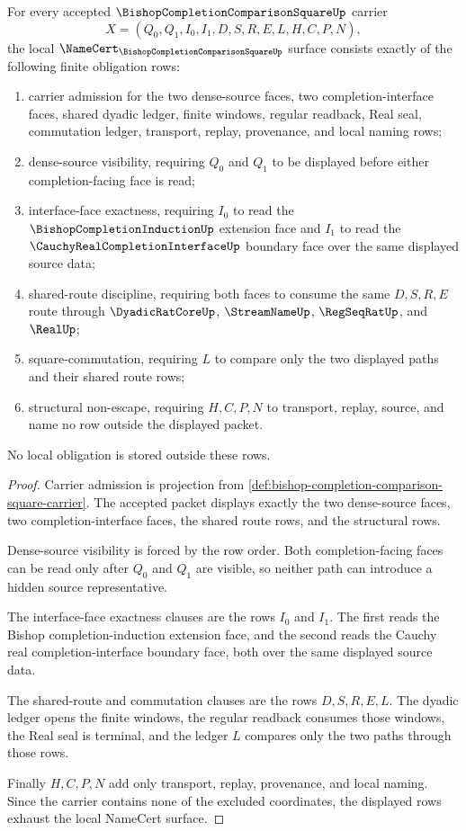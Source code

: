\begin{theorem}
\label{thm:bishop-completion-comparison-square-namecert-obligations}
For every accepted $\BishopCompletionComparisonSquareUp$ carrier
$$
X=(Q_0,Q_1,I_0,I_1,D,S,R,E,L,H,C,P,N),
$$
the local $\NameCert_{\BishopCompletionComparisonSquareUp}$ surface consists exactly of the following finite obligation rows:
\begin{enumerate}
\item carrier admission for the two dense-source faces, two completion-interface faces, shared dyadic ledger, finite windows, regular readback, Real seal, commutation ledger, transport, replay, provenance, and local naming rows;
\item dense-source visibility, requiring $Q_0$ and $Q_1$ to be displayed before either completion-facing face is read;
\item interface-face exactness, requiring $I_0$ to read the $\BishopCompletionInductionUp$ extension face and $I_1$ to read the $\CauchyRealCompletionInterfaceUp$ boundary face over the same displayed source data;
\item shared-route discipline, requiring both faces to consume the same $D,S,R,E$ route through $\DyadicRatCoreUp$, $\StreamNameUp$, $\RegSeqRatUp$, and $\RealUp$;
\item square-commutation, requiring $L$ to compare only the two displayed paths and their shared route rows;
\item structural non-escape, requiring $H,C,P,N$ to transport, replay, source, and name no row outside the displayed packet.
\end{enumerate}
No local obligation is stored outside these rows.
\end{theorem}
\begin{proof}
Carrier admission is projection from \autoref{def:bishop-completion-comparison-square-carrier}. The accepted packet displays exactly the two dense-source faces, two completion-interface faces, the shared route rows, and the structural rows.

Dense-source visibility is forced by the row order. Both completion-facing faces can be read only after $Q_0$ and $Q_1$ are visible, so neither path can introduce a hidden source representative.

The interface-face exactness clauses are the rows $I_0$ and $I_1$. The first reads the Bishop completion-induction extension face, and the second reads the Cauchy real completion-interface boundary face, both over the same displayed source data.

The shared-route and commutation clauses are the rows $D,S,R,E,L$. The dyadic ledger opens the finite windows, the regular readback consumes those windows, the Real seal is terminal, and the ledger $L$ compares only the two paths through those rows.

Finally $H,C,P,N$ add only transport, replay, provenance, and local naming. Since the carrier contains none of the excluded coordinates, the displayed rows exhaust the local NameCert surface.
\end{proof}

